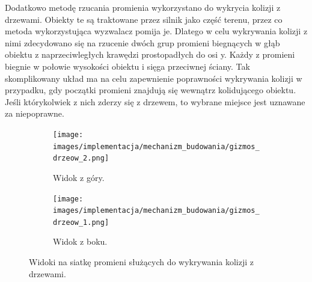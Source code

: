 Dodatkowo metodę rzucania promienia wykorzystano do wykrycia kolizji z drzewami. Obiekty te są traktowane przez silnik
jako część terenu, przez co metoda wykorzystująca wyzwalacz pomija je. Dlatego w celu wykrywania kolizji z nimi
zdecydowano się na rzucenie dwóch grup promieni biegnących w głąb obiektu z naprzeciwległych krawędzi prostopadłych do
osi y. Każdy z promieni biegnie w połowie wysokości obiektu i sięga przeciwnej ściany. Tak skomplikowany układ ma na
celu zapewnienie poprawności wykrywania kolizji w przypadku, gdy początki promieni znajdują się wewnątrz kolidującego
obiektu. Jeśli którykolwiek z nich zderzy się z drzewem, to wybrane miejsce jest uznawane za niepoprawne.

\begin{figure}[h!]
    \begin{subfigure}
      \centering
      \texttt{[image: images/implementacja/mechanizm\_budowania/gizmos\_drzeow\_2.png]}
      \caption{Widok z góry.}
    \end{subfigure}
    \begin{subfigure}
      \centering
      \texttt{[image: images/implementacja/mechanizm\_budowania/gizmos\_drzeow\_1.png]}
      \caption{Widok z boku.}
    \end{subfigure}
    \caption{Widoki na siatkę promieni służących do wykrywania kolizji z drzewami.}
\end{figure}
